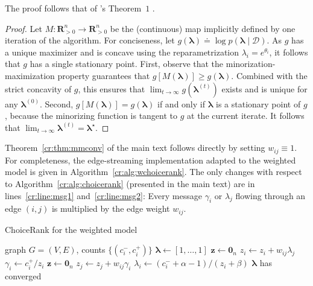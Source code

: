The proof follows that of \citeauthor{hunter2004mm}'s Theorem~$1$ \citeyearpar{hunter2004mm}.

\begin{proof}
Let $M: \mathbf{R}^n_{>0} \to \mathbf{R}^n_{>0}$ be the (continuous) map implicitly defined by one iteration of the algorithm.
For conciseness, let $g(\bm{\lambda}) \doteq \log p(\bm{\lambda} \mid \mathcal{D})$.
As $g$ has a unique maximizer and is concave using the reparametrization $\lambda_i = e^{\theta_i}$, it follows that $g$ has a single stationary point.
First, observe that the minorization-maximization property guarantees that $g \left[ M(\bm{\lambda}) \right] \ge g(\bm{\lambda})$.
Combined with the strict concavity of $g$, this ensures that $\lim_{t \to \infty} g(\bm{\lambda}^{(t)})$ exists and is unique for any $\bm{\lambda}^{(0)}$.
Second, $g \left[ M(\bm{\lambda}) \right] = g(\bm{\lambda})$ if and only if $\bm{\lambda}$ is a stationary point of $g$, because the minorizing function is tangent to $g$ at the current iterate.
It follows that $\lim_{t \to \infty} \bm{\lambda}^{(t)} = \bm{\lambda}^{\star}$.
\end{proof}

Theorem~\ref{cr:thm:mmconv} of the main text follows directly by setting $w_{ij} \equiv 1$.
For completeness, the edge-streaming implementation adapted to the weighted model is given in Algorithm~\ref{cr:alg:wchoicerank}.
The only changes with respect to Algorithm~\ref{cr:alg:choicerank} (presented in the main text) are in lines~\ref{cr:line:msg1} and~\ref{cr:line:msg2}:
Every message $\gamma_i$ or $\lambda_j$ flowing through an edge $(i,j)$ is multiplied by the edge weight $w_{ij}$.

\begin{algorithm}[ht]
  \caption{ChoiceRank for the weighted model}
  \label{cr:alg:wchoicerank}
  \begin{algorithmic}[1]
    \Require graph $G = (V, E)$, counts $\{ (c^-_i, c^+_i) \}$
    \State $\bm{\lambda} \gets [1, \ldots, 1]$
    \Repeat
      \State $\bm{z} \gets \bm{0}_n$
       $z_i \gets z_i + w_{ij} \lambda_j$ \label{cr:line:msg1}
       $\gamma_i \gets c^+_i / z_i$
      \State $\bm{z} \gets \bm{0}_n$
       $z_j \gets z_j + w_{ij} \gamma_i$ \label{cr:line:msg2}
       $\lambda_i \gets (c^-_i + \alpha - 1) / (z_i + \beta)$
    \Until $\bm{\lambda}$ has converged
  \end{algorithmic}
\end{algorithm}


